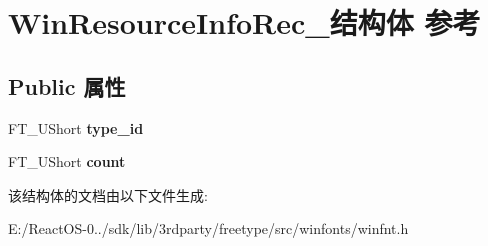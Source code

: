 \hypertarget{struct_win_resource_info_rec__}{}\section{Win\+Resource\+Info\+Rec\+\_\+结构体 参考}
\label{struct_win_resource_info_rec__}
\subsection*{Public 属性}
\begin{DoxyCompactItemize}
\item 
\mbox{\label{struct_win_resource_info_rec___ab9480c286489d77925ae0325b1ddf493}} 
F\+T\+\_\+\+U\+Short {\bfseries type\+\_\+id}
\item 
\mbox{\label{struct_win_resource_info_rec___a81078a1cf441d87132f175bcdd4de956}} 
F\+T\+\_\+\+U\+Short {\bfseries count}
\end{DoxyCompactItemize}


该结构体的文档由以下文件生成\+:\begin{DoxyCompactItemize}
\item 
E\+:/\+React\+O\+S-\/0../sdk/lib/3rdparty/freetype/src/winfonts/winfnt.\+h\end{DoxyCompactItemize}
